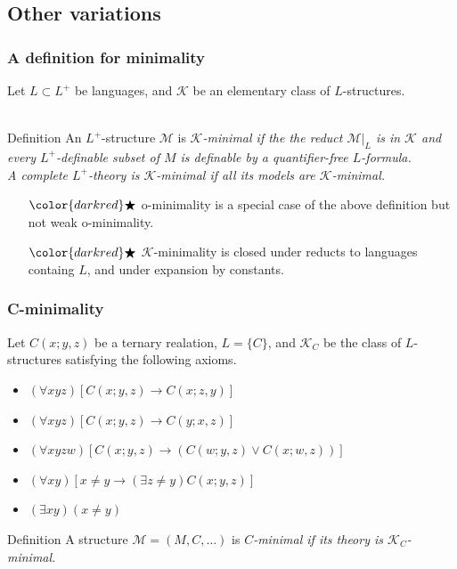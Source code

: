 \subsection{Other variations}

\begin{frame}[t]\frametitle{A definition for minimality}
    
	Let $L\subset L^{+}$ be languages, and $\mathcal{K}$ be an elementary 
	class of $L$-structures.\\~\\
	\begin{beamerboxesrounded}[shadow=true]{Definition}
		An $L^{+}$-structure $\mathcal{M}$ is \em $\mathcal{K}$-minimal \em if the 
		the reduct $\mathcal{M}|_{L}$ is in $\mathcal{K}$ and every $L^{+}$-definable subset of $M$ is definable by a quantifier-free $L$-formula.\\
		A complete $L^{+}$-theory is \em $\mathcal{K}$-minimal \em if all its models are $\mathcal{K}$-minimal.
	\end{beamerboxesrounded}

	\begin{itemize}
		\item[$\color{darkred}\bigstar$] o-minimality is a special case of the above definition but not weak o-minimality.
		\item[$\color{darkred}\bigstar$] $\mathcal{K}$-minimality is closed under reducts to languages containg $L$, and under expansion by constants.
	\end{itemize}

\end{frame}

\begin{frame}[t]\frametitle{C-minimality}
    
	Let $C(x;y,z)$ be a ternary realation, $L=\{ C \}$, and $\mathcal{K}_{C}$ 
	be the class of $L$-structures satisfying the following axioms.

	\begin{itemize}
		\item $(\forall xyz)[C(x;y,z)\to C(x;z,y)]$
		\item $(\forall xyz)[C(x;y,z)\to C(y;x,z)]$
		\item $(\forall xyzw)[C(x;y,z)\to (C(w;y,z) \vee C(x;w,z))]$
		\item $(\forall xy)[x\neq y \to (\exists z \neq y)C(x;y,z)]$
		\item $(\exists xy)(x\neq y)$
	\end{itemize}

	\begin{beamerboxesrounded}[shadow=true]{Definition}
		A structure $\mathcal{M}=(M,C,\ldots)$ is \em $C$-minimal \em if 
		its theory is $\mathcal{K}_{C}$-minimal.
	\end{beamerboxesrounded}

\end{frame}

